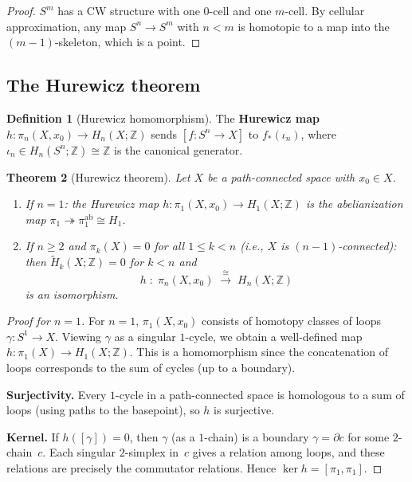 \documentclass[12pt,a4paper,openany]{book}
\theoremstyle{definition}
\newtheorem{definition}{Definition}[chapter]
\theoremstyle{plain}
\newtheorem{theorem}[definition]{Theorem}
\theoremstyle{remark}
\newcommand{\Z}{\mathbb{Z}}
\begin{document}
\begin{proof}
$S^m$ has a CW structure with one $0$-cell and one $m$-cell.  By
cellular approximation, any map $S^n\to S^m$ with $n<m$ is homotopic
to a map into the $(m-1)$-skeleton, which is a point.
\end{proof}

\subsection{The Hurewicz theorem}

\begin{definition}[Hurewicz homomorphism]
The \textbf{Hurewicz map}
$h\colon\pi_n(X,x_0)\to H_n(X;\Z)$ sends $[f\colon S^n\to X]$ to
$f_*(\iota_n)$, where $\iota_n\in H_n(S^n;\Z)\cong\Z$ is the
canonical generator.
\end{definition}

\begin{theorem}[Hurewicz theorem]\label{thm:hurewicz}
Let $X$ be a path-connected space with $x_0\in X$.
\begin{enumerate}[label=(\roman*)]
  \item If $n=1$: the Hurewicz map $h\colon\pi_1(X,x_0)\to H_1(X;\Z)$
    is the abelianization map
    $\pi_1\twoheadrightarrow\pi_1^{\mathrm{ab}}\cong H_1$.
  \item If $n\ge2$ and $\pi_k(X)=0$ for all $1\le k<n$ (i.e., $X$ is
    $(n{-}1)$-connected): then
    $\widetilde{H}_k(X;\Z)=0$ for $k<n$ and
    \[
      h\;:\;\pi_n(X,x_0)\;\xrightarrow{\;\cong\;}\;H_n(X;\Z)
    \]
    is an isomorphism.
\end{enumerate}
\end{theorem}

\begin{proof}[Proof for $n=1$]
For $n=1$, $\pi_1(X,x_0)$ consists of homotopy classes of loops
$\gamma\colon S^1\to X$.  Viewing $\gamma$ as a singular $1$-cycle, we
obtain a well-defined map $h\colon\pi_1(X)\to H_1(X;\Z)$.  This is
a homomorphism since the concatenation of loops corresponds to the sum
of cycles (up to a boundary).

\textbf{Surjectivity.} Every $1$-cycle in a path-connected space is
homologous to a sum of loops (using paths to the basepoint), so $h$
is surjective.

\textbf{Kernel.} If $h([\gamma])=0$, then $\gamma$ (as a $1$-chain)
is a boundary $\gamma=\partial c$ for some $2$-chain~$c$.  Each
singular $2$-simplex in~$c$ gives a relation among loops, and these
relations are precisely the commutator relations.  Hence
$\ker h=[\pi_1,\pi_1]$.
\end{proof}
\end{document}
